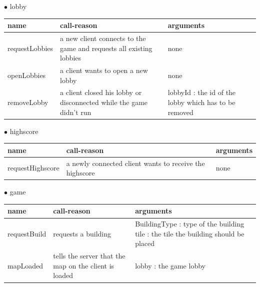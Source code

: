 \documentclass{scrartcl}
\newcommand{\n}{\newline}
\begin{document}
$\bullet$ lobby
\begin{center}
    \begin{tabular}{| p{3.1cm} | p{5cm} | p{5.9cm} |}
        \hline
        \textbf{name} & \textbf{call-reason} & \textbf{arguments} \\ \hline
        requestLobbies & a new client connects to the game and requests all existing lobbies & none\\ \hline
        openLobbies & a client wants to open a new lobby & none \\ \hline
        removeLobby & a client closed his lobby or disconnected while the game didn't run & lobbyId : the id of the lobby which has to be removed \\ \hline
    \end{tabular}
\end{center}
$\bullet$ highscore
\begin{center}
    \begin{tabular}{| p{3.1cm} | p{5cm} | p{5.9cm} |}
        \hline
        \textbf{name} & \textbf{call-reason} & \textbf{arguments} \\ \hline
        requestHighscore & a newly connected client wants to receive the highscore & none \\ \hline
    \end{tabular}
\end{center}
$\bullet$ game
\begin{center}
    \begin{tabular}{| p{3.1cm} | p{5cm} | p{5.9cm} |}
        \hline
        \textbf{name} & \textbf{call-reason} & \textbf{arguments} \\ \hline
        requestBuild & requests a building & BuildingType : type of the building\n
        tile : the tile the building should be placed \\ \hline
        mapLoaded & tells the server that the map on the client is loaded & lobby : the game lobby \\ \hline
    \end{tabular}
\end{center}

\pagebreak
\end{document}
